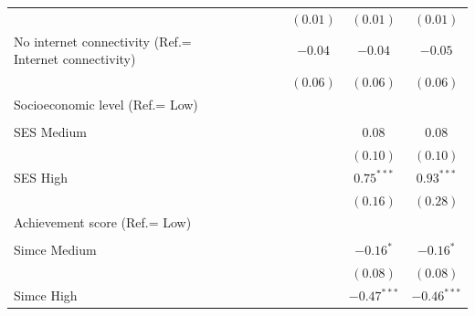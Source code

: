 \documentclass[
  12pt,
  letterpaper,
]{article}
\begin{document}
\begin{table}
{\begin{center}
{\begin{threeparttable}
\begin{tabular}{l c c c c c c}
                                                       &               &               &               & $(0.01)$      & $(0.01)$      & $(0.01)$      \\
No internet connectivity (Ref.= Internet connectivity) &               &               &               & $-0.04$       & $-0.04$       & $-0.05$       \\
                                                       &               &               &               & $(0.06)$      & $(0.06)$      & $(0.06)$      \\
Socioeconomic level (Ref.= Low)                        &               &               &               &               &               &               \\
                                                       &               &               &               &               &               &               \\
\quad SES Medium                                       &               &               &               &               & $0.08$        & $0.08$        \\
                                                       &               &               &               &               & $(0.10)$      & $(0.10)$      \\
\quad SES High                                         &               &               &               &               & $0.75^{***}$  & $0.93^{***}$  \\
                                                       &               &               &               &               & $(0.16)$      & $(0.28)$      \\
Achievement score (Ref.= Low)                          &               &               &               &               &               &               \\
                                                       &               &               &               &               &               &               \\
\quad Simce Medium                                     &               &               &               &               & $-0.16^{*}$   & $-0.16^{*}$   \\
                                                       &               &               &               &               & $(0.08)$      & $(0.08)$      \\
\quad Simce High                                       &               &               &               &               & $-0.47^{***}$ & $-0.46^{***}$ \\

\end{tabular}
\end{threeparttable}}
\end{center}}
\end{table}
\end{document}
